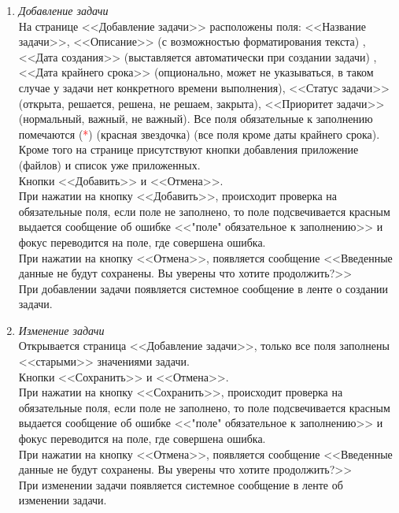 \documentclass[14pt,a4paper]{extarticle}
\begin{document}
\begin{enumerate}
\begin{enumerate}
				\item {\it Добавление задачи}\\
				На странице <<Добавление задачи>> расположены поля: <<Название задачи>>, <<Описание>> (с возможностью форматирования текста) , <<Дата создания>> (выставляется автоматически при создании задачи) , <<Дата крайнего срока>> (опционально, может не указываться, в таком случае у задачи нет конкретного времени выполнения), <<Статус задачи>> (открыта, решается, решена, не решаем, закрыта), <<Приоритет задачи>> (нормальный, важный, не важный). Все поля обязательные к заполнению помечаются (\textcolor{red}{*}) (красная звездочка) (все поля кроме даты крайнего срока).\\
				Кроме того на странице присутствуют кнопки добавления приложение (файлов) и список уже приложенных.\\ 
				Кнопки <<Добавить>> и <<Отмена>>.\\
				При нажатии на кнопку <<Добавить>>, происходит проверка на обязательные поля, если поле не заполнено, то поле подсвечивается красным выдается сообщение об ошибке <<"поле" обязательное к заполнению>> и фокус переводится на поле, где совершена ошибка.\\
				При нажатии на кнопку <<Отмена>>, появляется сообщение <<Введенные данные не будут сохранены. Вы уверены что хотите продолжить?>>\\
				При добавлении задачи появляется системное сообщение в ленте о создании задачи.

				\item {\it Изменение задачи}\\
				Открывается страница <<Добавление задачи>>, только все поля заполнены <<старыми>> значениями задачи.\\
				Кнопки <<Сохранить>> и <<Отмена>>.\\
				При нажатии на кнопку <<Сохранить>>, происходит проверка на обязательные поля, если поле не заполнено, то поле подсвечивается красным выдается сообщение об ошибке <<"поле" обязательное к заполнению>> и фокус переводится на поле, где совершена ошибка.\\
				При нажатии на кнопку <<Отмена>>, появляется сообщение <<Введенные данные не будут сохранены. Вы уверены что хотите продолжить?>>\\
				При изменении задачи появляется системное сообщение в ленте об изменении задачи.


			\end{enumerate}
		
	\end{enumerate}
	
\end{document}
